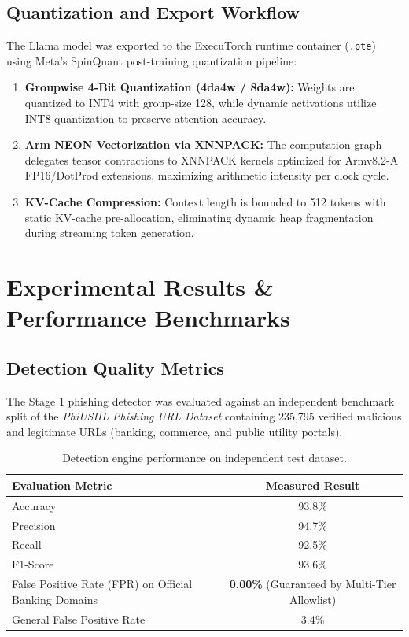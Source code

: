 \documentclass[11pt,a4paper]{article}
\begin{document}
\subsection{Quantization and Export Workflow}
The Llama model was exported to the ExecuTorch runtime container (\texttt{.pte}) using Meta's SpinQuant post-training quantization pipeline:
\begin{enumerate}
    \item \textbf{Groupwise 4-Bit Quantization (4da4w / 8da4w):} Weights are quantized to INT4 with group-size 128, while dynamic activations utilize INT8 quantization to preserve attention accuracy.
    \item \textbf{Arm NEON Vectorization via XNNPACK:} The computation graph delegates tensor contractions to XNNPACK kernels optimized for Armv8.2-A FP16/DotProd extensions, maximizing arithmetic intensity per clock cycle.
    \item \textbf{KV-Cache Compression:} Context length is bounded to 512 tokens with static KV-cache pre-allocation, eliminating dynamic heap fragmentation during streaming token generation.
\end{enumerate}

\section{Experimental Results \& Performance Benchmarks}

\subsection{Detection Quality Metrics}
The Stage 1 phishing detector was evaluated against an independent benchmark split of the \textit{PhiUSIIL Phishing URL Dataset} containing 235,795 verified malicious and legitimate URLs (banking, commerce, and public utility portals).

\begin{table}[ht!]
\centering
\small
\begin{tabular}{lc}
\toprule
\textbf{Evaluation Metric} & \textbf{Measured Result} \\
\midrule
Accuracy & 93.8\% \\
Precision & 94.7\% \\
Recall & 92.5\% \\
F1-Score & 93.6\% \\
False Positive Rate (FPR) on Official Banking Domains & \textbf{0.00\%} (Guaranteed by Multi-Tier Allowlist) \\
General False Positive Rate & 3.4\% \\
\bottomrule
\end{tabular}
\caption{Detection engine performance on independent test dataset.}
\label{tab:detection_metrics}
\end{table}
\end{document}
